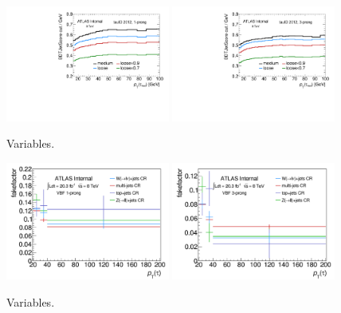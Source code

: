 \clearpage

\begin{figure}[tp]
  \centering
  \includegraphics[width=0.48\textwidth]{figures/backgrounds/jetBDT-1p}
  \includegraphics[width=0.48\textwidth]{figures/backgrounds/jetBDT-3p}
  \caption{Variables.}
  \label{fig:backgrounds-workingpoints}
\end{figure}

\begin{figure}[tp]
  \centering
  \includegraphics[width=0.48\textwidth]{figures/backgrounds/fakefactor_8TeV_vbf_1p_CRs}
  \includegraphics[width=0.48\textwidth]{figures/backgrounds/fakefactor_8TeV_vbf_3p_CRs}
  \caption{Variables.}
  \label{fig:backgrounds-fakefactorsVBFCRs}
\end{figure}

